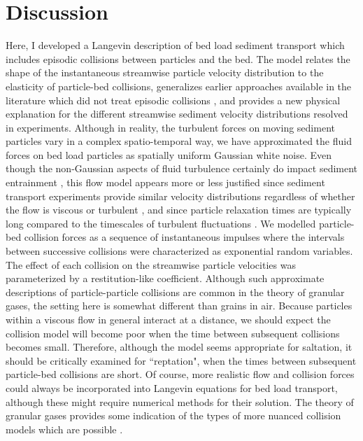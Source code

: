 \section{Discussion}
\label{sec:discussion}

Here, I developed a Langevin description of bed load sediment transport which includes episodic collisions between particles and the bed.
The model relates the shape of the instantaneous streamwise particle velocity distribution to the elasticity of particle-bed collisions,
generalizes earlier approaches available in the literature which did not treat episodic collisions \citep{Ancey2014,Fan2014}, and provides a new physical explanation for the different streamwise sediment velocity distributions resolved in experiments.
Although in reality, the turbulent forces on moving sediment particles vary in a complex spatio-temporal way, we have approximated the fluid forces on bed load particles as spatially uniform Gaussian white noise. Even though the non-Gaussian aspects of fluid turbulence certainly do impact sediment entrainment \citep{Coleman2019,Celik2014}, this flow model appears more or less justified since sediment transport experiments provide similar velocity distributions regardless of whether the flow is viscous or turbulent \citep{Lajeunesse2010, Charru2004}, and since particle relaxation times are typically long compared to the timescales of turbulent fluctuations \citep{Hofland2006,Schmeeckle2007,Nakagawa1981}.
We modelled particle-bed collision forces as a sequence of instantaneous impulses where the intervals between successive collisions were characterized as exponential random variables. The effect of each collision on the streamwise particle velocities was parameterized by a restitution-like coefficient.
Although such approximate descriptions of particle-particle collisions are common in the theory of granular gases, the setting here is somewhat different than grains in air. Because particles within a viscous flow in general interact at a distance, we should expect the collision model will become poor when the time between subsequent collisions becomes small. Therefore, although the model seems appropriate for saltation, it should be critically examined for ``reptation", when the times between subsequent particle-bed collisions are short. Of course, more realistic flow and collision forces could always be incorporated into Langevin equations for bed load transport, although these might require numerical methods for their solution. The theory of granular gases provides some indication of the types of more nuanced collision models which are possible \citep{Brilliantov2004,other..}.

